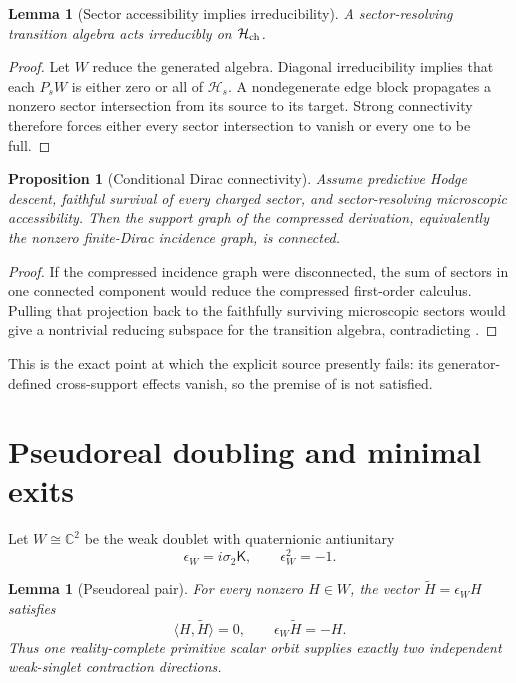 \documentclass[11pt,oneside,openany]{book}
\numberwithin{equation}{chapter}
\newtheorem{proposition}[theorem]{Proposition}
\newtheorem{lemma}[theorem]{Lemma}
\theoremstyle{definition}
\theoremstyle{remark}
\newcommand{\C}{\mathbb C}
\newcommand{\ip}[2]{\langle #1,#2\rangle}
\begin{document}
\begin{lemma}[Sector accessibility implies irreducibility]
\label{lem:sector-irreducibility}
A sector-resolving transition algebra acts irreducibly on $\mathcal H_{\rm ch}$.
\end{lemma}

\begin{proof}
Let $W$ reduce the generated algebra.  Diagonal irreducibility implies that each $P_sW$ is either zero or all of $\mathcal H_s$.  A nondegenerate edge block propagates a nonzero sector intersection from its source to its target.  Strong connectivity therefore forces either every sector intersection to vanish or every one to be full.
\end{proof}

\begin{proposition}[Conditional Dirac connectivity]
\label{prop:dirac-connectivity}
Assume predictive Hodge descent, faithful survival of every charged sector, and sector-resolving microscopic accessibility.  Then the support graph of the compressed derivation, equivalently the nonzero finite-Dirac incidence graph, is connected.
\end{proposition}

\begin{proof}
If the compressed incidence graph were disconnected, the sum of sectors in one connected component would reduce the compressed first-order calculus.  Pulling that projection back to the faithfully surviving microscopic sectors would give a nontrivial reducing subspace for the transition algebra, contradicting .
\end{proof}

This is the exact point at which the explicit source presently fails: its generator-defined cross-support effects vanish, so the premise of  is not satisfied.

\section{Pseudoreal doubling and minimal exits}
Let $W\cong\C^2$ be the weak doublet with quaternionic antiunitary
\[
 \epsilon_W=i\sigma_2\mathsf K,
 \qquad
 \epsilon_W^2=-1.
\]

\begin{lemma}[Pseudoreal pair]
\label{lem:pseudoreal-pair}
For every nonzero $H\in W$, the vector $\widetilde H=\epsilon_WH$ satisfies
\[
 \ip{H}{\widetilde H}=0,
 \qquad
 \epsilon_W\widetilde H=-H.
\]
Thus one reality-complete primitive scalar orbit supplies exactly two independent weak-singlet contraction directions.
\end{lemma}
\end{document}
